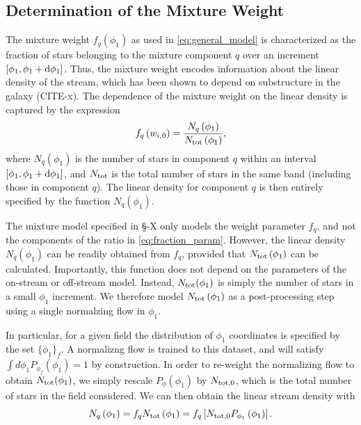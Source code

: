 \documentclass[twocolumn]{aastex631}
\begin{document}
    \subsection{Determination of the Mixture Weight} \label{sub:mixture_weight}
        The mixture weight $f_q(\phi_1)$ as used in \autoref{eq:general_model} is characterized as the fraction of stars belonging to the mixture component $q$ over an increment $[\phi_1, \phi_1 + \dif{\phi_1}]$. Thus, the mixture weight encodes information about the linear density of the stream, which has been shown to depend on substructure in the galaxy (CITE-x). The dependence of the mixture weight on the linear density is captured by the expression
        \begin{equation}\label{eq:fraction_param}
            f_q\left(w_{i,0}\right) = \frac{N_q\left(\phi_1\right)}{N_{\rm tot}\left(\phi_1\right)},
        \end{equation}
        where $N_q\left(\phi_1\right)$ is the number of stars in component $q$ within an interval $[\phi_1, \phi_1 + \dif{\phi_1}]$, and 
        $N_{\rm tot}$ is the total number of stars in the same band (including those in component $q$). The linear  density for component $q$ is then entirely specified by the function $N_q(\phi_1)$.

        The mixture model specified in \S-X only models the weight parameter $f_q$, and not the components of the ratio in \autoref{eq:fraction_param}. However, the linear density $N_q(\phi_1)$ can be readily obtained from $f_q$, provided that $N_{\rm tot}\left(\phi_1\right)$ can be calculated. Importantly, this function does not depend on the parameters of the on-stream or off-stream model. Instead, $N_{\rm tot}(\phi_1)$ is simply the number of stars in a small $\phi_1$ increment. We therefore model $N_{\rm tot}\left(\phi_1\right)$ as a post-processing step using a single normalzing flow in $\phi_1$. 

        In particular, for a given field the distribution of $\phi_1$ coordinates is specified by the set $\{\phi_1\}_f$. A normalizng flow is trained to this dataset, and will satisfy $\int d\phi_1 P_{\phi_f}(\phi_1) = 1$ by construction. In order to re-weight the normalizing flow to obtain $N_{\rm tot}(\phi_1)$, we simply rescale $P_{\phi}(\phi_1)$ by $N_{\rm tot,0}$, which is the total number of stars in the field considered. We can then obtain the linear stream density with
        \begin{equation}
            N_q\left(\phi_1\right) = f_q N_{\rm tot} \left(\phi_1\right)  = f_q \left[N_{\rm tot,0} P_{\phi_1}\left(\phi_1\right) \right] .
        \end{equation}
\end{document}
